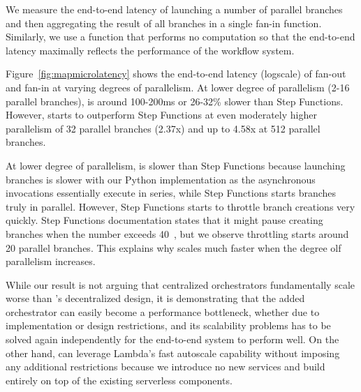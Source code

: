 We measure the end-to-end latency of launching a number of parallel branches
and then aggregating the result of all branches in a single fan-in function.
Similarly, we use a function that performs no computation so that the
end-to-end latency maximally reflects the performance of the workflow system.


Figure~\ref{fig:mapmicrolatency} shows the end-to-end latency (logscale) of
fan-out and fan-in at varying degrees of parallelism. At lower degree of
parallelism (2-16 parallel branches), \name{} is around 100-200ms or 26-32\%
slower than Step Functions. However, \name{} starts to outperform Step
Functions at even moderately higher parallelism of 32 parallel branches
(2.37x) and up to 4.58x at 512 parallel branches.

At lower degree of parallelism, \name{} is slower than Step Functions because
launching branches is slower with our Python implementation as the
asynchronous invocations essentially execute in series, while Step Functions
starts branches truly in parallel. However, Step Functions starts to throttle
branch creations very quickly. Step Functions documentation states that it
might pause creating branches when the number exceeds
40~\cite{aws-step-functions-map-state}, but we observe throttling starts
around 20 parallel branches. This explains why \name{} scales much faster when
the degree olf parallelism increases.

While our result is not arguing that centralized orchestrators fundamentally
scale worse than \name{}'s decentralized design, it is demonstrating that the
added orchestrator can easily become a performance bottleneck, whether due to
implementation or design restrictions, and its scalability problems has to be
solved again independently for the end-to-end system to perform well. On the
other hand, \name{} can leverage Lambda's fast autoscale capability without
imposing any additional restrictions because we introduce no new services and
build entirely on top of the existing serverless components.


